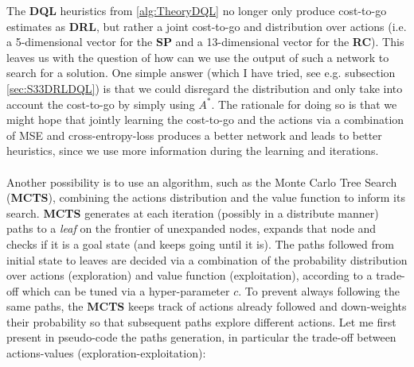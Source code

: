 \label{sec:TheoryMCTS}

The \textbf{DQL} heuristics from \ref{alg:TheoryDQL} no longer only produce cost-to-go estimates as \textbf{DRL}, but rather a joint cost-to-go and distribution over actions (i.e. a 5-dimensional vector for the \textbf{SP} and a 13-dimensional vector for the \textbf{RC}). This leaves us with the question of how can we use the output of such a network to search for a solution. One simple answer (which I have tried, see e.g. subsection \ref{sec:S33DRLDQL}) is that we could disregard the distribution and only take into account the cost-to-go by simply using $A^{*}$. The rationale for doing so is that we might hope that jointly learning the cost-to-go and the actions via a combination of MSE and cross-entropy-loss produces a better network and leads to better heuristics, since we use more information during the learning and iterations.
\\
\\
Another possibility is to use an algorithm, such as the Monte Carlo Tree Search (\textbf{MCTS}), combining the actions distribution and the value function to inform its search. \textbf{MCTS} generates at each iteration (possibly in a distribute manner) paths to a \textit{leaf} on the frontier of unexpanded nodes, expands that node and checks if it is a goal state (and keeps going until it is). The paths followed from initial state to leaves are decided via a combination of the probability distribution over actions (exploration) and value function (exploitation), according to a trade-off which can be tuned via a hyper-parameter $c$. To prevent always following the same paths, the \textbf{MCTS} keeps track of actions already followed and down-weights their probability so that subsequent paths explore different actions. Let me first present in pseudo-code the paths generation, in particular the trade-off between actions-values (exploration-exploitation):
\\


